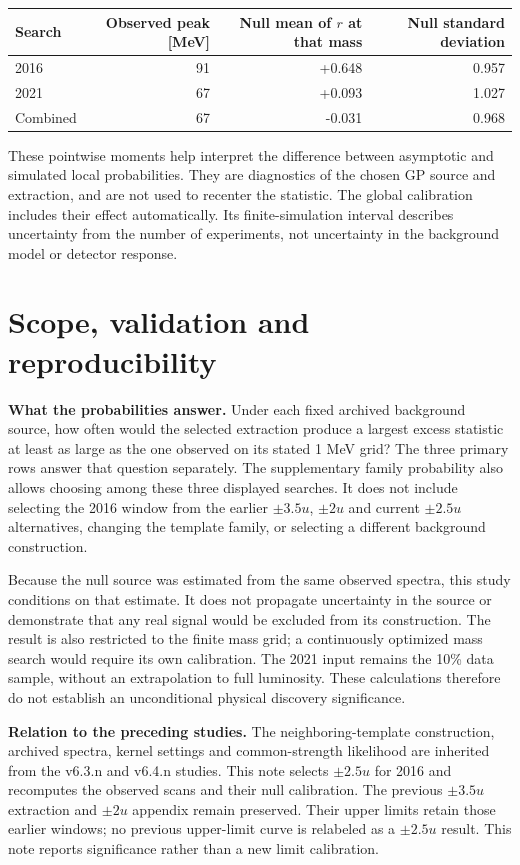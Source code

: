 \documentclass[11pt]{article}
\begin{document}
\begin{center}\small\begin{tabular}{lrrr}\toprule
Search & Observed peak [MeV] & Null mean of $r$ at that mass & Null standard deviation\\\midrule
2016 & 91 & +0.648 & 0.957\\
2021 & 67 & +0.093 & 1.027\\
Combined & 67 & -0.031 & 0.968\\
\bottomrule\end{tabular}\end{center}

These pointwise moments help interpret the difference between asymptotic and simulated local probabilities. They are diagnostics of the chosen GP source and extraction, and are not used to recenter the statistic. The global calibration includes their effect automatically. Its finite-simulation interval describes uncertainty from the number of experiments, not uncertainty in the background model or detector response.

\clearpage\section*{Scope, validation and reproducibility}

\textbf{What the probabilities answer.} Under each fixed archived background source, how often would the selected extraction produce a largest excess statistic at least as large as the one observed on its stated 1 MeV grid? The three primary rows answer that question separately. The supplementary family probability also allows choosing among these three displayed searches. It does not include selecting the 2016 window from the earlier $\pm3.5u$, $\pm2u$ and current $\pm2.5u$ alternatives, changing the template family, or selecting a different background construction.

Because the null source was estimated from the same observed spectra, this study conditions on that estimate. It does not propagate uncertainty in the source or demonstrate that any real signal would be excluded from its construction. The result is also restricted to the finite mass grid; a continuously optimized mass search would require its own calibration. The 2021 input remains the 10\% data sample, without an extrapolation to full luminosity. These calculations therefore do not establish an unconditional physical discovery significance.

\textbf{Relation to the preceding studies.} The neighboring-template construction, archived spectra, kernel settings and common-strength likelihood are inherited from the v6.3.n and v6.4.n studies. This note selects $\pm2.5u$ for 2016 and recomputes the observed scans and their null calibration. The previous $\pm3.5u$ extraction and $\pm2u$ appendix remain preserved. Their upper limits retain those earlier windows; no previous upper-limit curve is relabeled as a $\pm2.5u$ result. This note reports significance rather than a new limit calibration.
\end{document}
